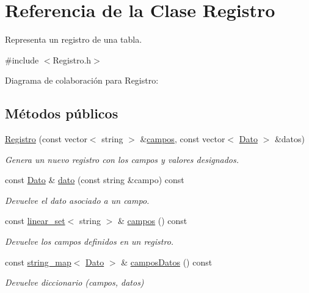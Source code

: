 \hypertarget{classRegistro}{}\section{Referencia de la Clase Registro}
\label{classRegistro}


Representa un registro de una tabla.  




{\ttfamily \#include $<$Registro.\+h$>$}



Diagrama de colaboración para Registro\+:
\subsection*{Métodos públicos}
\begin{DoxyCompactItemize}
\item 
\mbox{\hyperlink{classRegistro_af3717314d0e658a463ffd8ac5b073441}{Registro}} (const vector$<$ string $>$ \&\mbox{\hyperlink{classRegistro_a6c6e8fbd5aa47acd14597f240b32c95e}{campos}}, const vector$<$ \mbox{\hyperlink{classDato}{Dato}} $>$ \&datos)
\begin{DoxyCompactList}\small\item\em Genera un nuevo registro con los campos y valores designados. \end{DoxyCompactList}\item 
const \mbox{\hyperlink{classDato}{Dato}} \& \mbox{\hyperlink{classRegistro_a2b61358029430c966c18c742eda61d1d}{dato}} (const string \&campo) const
\begin{DoxyCompactList}\small\item\em Devuelve el dato asociado a un campo. \end{DoxyCompactList}\item 
const \mbox{\hyperlink{classlinear__set}{linear\+\_\+set}}$<$ string $>$ \& \mbox{\hyperlink{classRegistro_a6c6e8fbd5aa47acd14597f240b32c95e}{campos}} () const
\begin{DoxyCompactList}\small\item\em Devuelve los campos definidos en un registro. \end{DoxyCompactList}\item 
const \mbox{\hyperlink{classstring__map}{string\+\_\+map}}$<$ \mbox{\hyperlink{classDato}{Dato}} $>$ \& \mbox{\hyperlink{classRegistro_af3f9eaec87fdf153f2c98c410bd987be}{campos\+Datos}} () const
\begin{DoxyCompactList}\small\item\em Devuelve diccionario (campos, datos) \end{DoxyCompactList}\end{DoxyCompactItemize}

